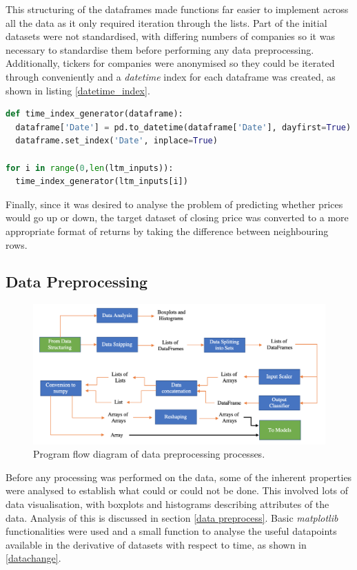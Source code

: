 \documentclass[10pt,onecolumn,letterpaper]{article}
\begin{document}
This structuring of the dataframes made functions far easier to implement across all the data as it only required iteration through the lists. Part of the initial datasets were not standardised, with differing numbers of companies so it was necessary to standardise them before performing any data preprocessing. Additionally, tickers for companies were anonymised so they could be iterated through conveniently and a \textit{datetime} index for each dataframe was created, as shown in listing \ref{datetime_index}. 

\begin{lstlisting}[language=Python, breaklines=true, label={datetime_index}, caption={Function to create datetime index for dataframes.}]
def time_index_generator(dataframe):
  dataframe['Date'] = pd.to_datetime(dataframe['Date'], dayfirst=True)
  dataframe.set_index('Date', inplace=True)

for i in range(0,len(ltm_inputs)):
  time_index_generator(ltm_inputs[i])
\end{lstlisting} 

Finally, since it was desired to analyse the problem of predicting whether prices would go up or down, the target dataset of closing price was converted to a more appropriate format of returns by taking the difference between neighbouring rows. 

\subsection{Data Preprocessing}

\begin{figure}[!hbt!]
\centering
\includegraphics[width=\columnwidth]{data_preprocessing.png}
\caption{Program flow diagram of data preprocessing processes.}
\label{data_preprocessing}
\end{figure}

Before any processing was performed on the data, some of the inherent properties were analysed to establish what could or could not be done. This involved lots of data visualisation, with boxplots and histograms describing attributes of the data. Analysis of this is discussed in section \ref{data preprocess}. Basic \textit{matplotlib} functionalities were used and a small function to analyse the useful datapoints available in the derivative of datasets with respect to time, as shown in \ref{datachange}. 
\end{document}
